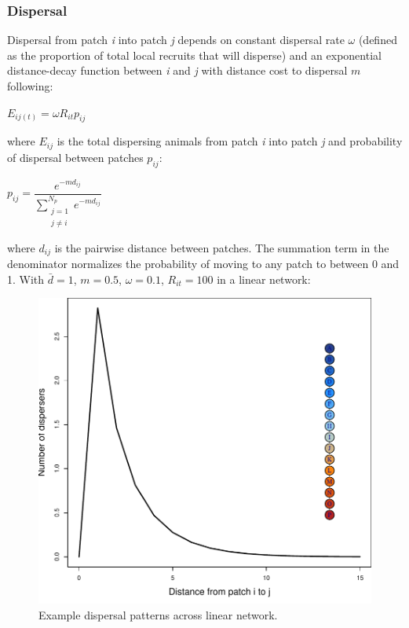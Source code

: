 \documentclass[]{article}
\begin{document}
\hypertarget{dispersal}{%
\subsubsection{Dispersal}\label{dispersal}}

Dispersal from patch \emph{i} into patch \emph{j} depends on constant
dispersal rate \(\omega\) (defined as the proportion of total local
recruits that will disperse) and an exponential distance-decay function
between \emph{i} and \emph{j} with distance cost to dispersal \(m\)
following:

\(E_{ij(t)}=\omega R_{it}p_{ij}\)

where \(E_{ij}\) is the total dispersing animals from patch \emph{i}
into patch \emph{j} and probability of dispersal between patches
\(p_{ij}\):

\(p_{ij}=\dfrac{e^{-md_{ij}}}{\sum\limits_{\substack{j=1 \\ j\neq i}}^{N_p} e^{-md_{ij}}}\)

where \(d_{ij}\) is the pairwise distance between patches. The summation
term in the denominator normalizes the probability of moving to any
patch to between 0 and 1. With \(\bar{d}= 1\), \(m=0.5\),
\(\omega=0.1\), \(R_{it}=100\) in a linear network:

\begin{figure}[H]

{\centering \includegraphics{Managing_for_ecological_surprises_in_metapopulations_makeHTML_files/figure-latex/dispersal-1} 

}

\caption{Example dispersal patterns across linear network.}\label{fig:dispersal}
\end{figure}
\end{document}
